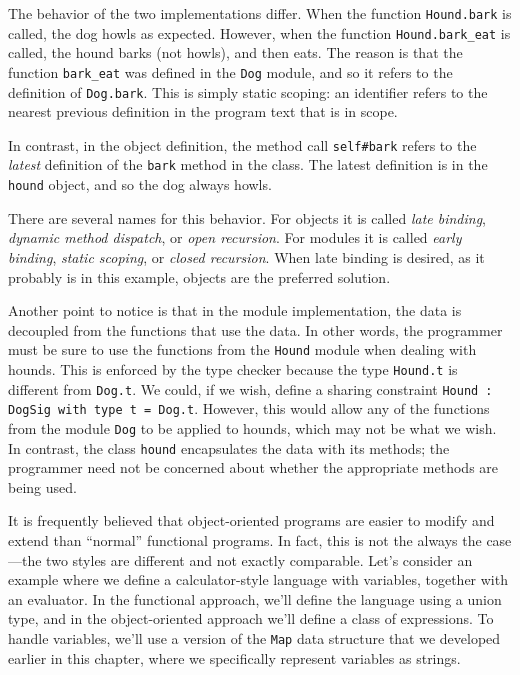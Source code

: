 The behavior of the two implementations differ.  When the
function \hbox{\lstinline$Hound.bark$} is called, the dog howls as expected.
However, when the function \hbox{\lstinline$Hound.bark_eat$} is called, the
hound barks (not howls), and then eats.  The reason is that the
function \hbox{\lstinline$bark_eat$} was defined in the \hbox{\lstinline$Dog$}
module, and so it refers to the definition of \hbox{\lstinline$Dog.bark$}.
This is simply static scoping: an identifier refers to the nearest
previous definition in the program text that is in scope.

In contrast, in the object definition, the method
call \hbox{\lstinline$self#bark$} refers to the \emph{latest} definition of
the \hbox{\lstinline$bark$} method in the class.  The latest definition is in
the \hbox{\lstinline$hound$} object, and so the dog always howls.

There are several names for this behavior.  For objects it is
called \emph{late binding}, \emph{dynamic method dispatch},
or \emph{open recursion}.  For modules it is called \emph{early
binding}, \emph{static scoping}, or \emph{closed recursion}.
When late binding is desired, as it probably is in this example,
objects are the preferred solution.

Another point to notice is that in the module implementation, the data
is decoupled from the functions that use the data.  In other words,
the programmer must be sure to use the functions from
the \hbox{\lstinline$Hound$} module when dealing with hounds.  This is
enforced by the type checker because the type \hbox{\lstinline$Hound.t$} is
different from \hbox{\lstinline$Dog.t$}.  We could, if we wish, define a
sharing constraint
\hbox{\lstinline$Hound : DogSig with type t = Dog.t$}.
However, this would allow any of the functions from the
module \hbox{\lstinline$Dog$} to be applied to hounds, which may not be what
we wish.  In contrast, the class \hbox{\lstinline$hound$} encapsulates the
data with its methods; the programmer need not be concerned about
whether the appropriate methods are being used.


It is frequently believed that object-oriented programs are easier to
modify and extend than ``normal'' functional programs.  In fact, this
is not the always the case---the two styles are different and not
exactly comparable.  Let's consider an example where we define a
calculator-style language with variables, together with an evaluator.
In the functional approach, we'll define the language using a union
type, and in the object-oriented approach we'll define a class of
expressions.  To handle variables, we'll use a version of
the \hbox{\lstinline$Map$} data structure that we developed earlier in this
chapter, where we specifically represent variables as strings.

